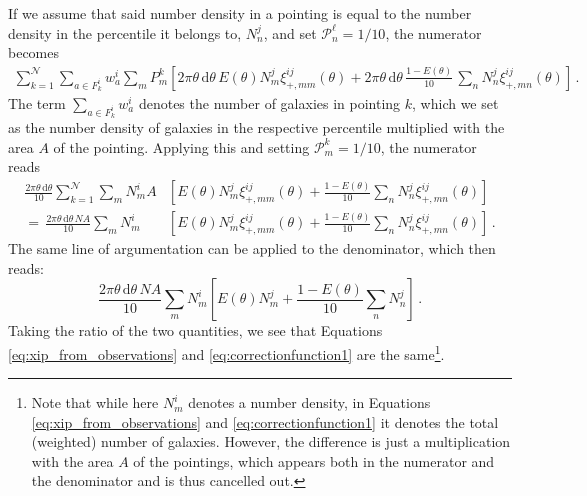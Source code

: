 \documentclass[referee]{aa} %
\renewcommand{\[}{\begin{equation}}
\renewcommand{\]}{\end{equation}}
\renewcommand{\rm}{\mathrm}
\def\d{\rm{d}}
\begin{document}
\begin{appendix}
If we assume that said number density in a pointing is equal to the number density in the percentile it belongs to, $N_n^j$, and set $\mathcal{P}_n^\ell=1/10$, the numerator becomes \begin{align}
\sum_{k=1}^\mathcal{N} \sum_{a\in F_k^i} w_a^i \sum_m P^k_m \left[2\pi\theta\,\d\theta\,E(\theta) N_m^j \xi_{+,mm}^{ij}(\theta) + 2\pi\theta\,\d\theta\,\frac{1-E(\theta)}{10}\, \sum_n N_n^j \xi_{+,mn}^{ij}(\theta) \right] \, .
\end{align}
The term $\sum_{a\in F_k^i} w_a^i$ denotes the number of galaxies in pointing $k$, which we set as the number density of galaxies in the respective percentile multiplied with the area $A$ of the pointing. Applying this and setting $\mathcal{P}_m^k=1/10$, the numerator reads 
\begin{align}
\frac{2\pi\theta\,\d\theta}{10} \sum_{k=1}^\mathcal{N} \sum_m N_m^i A &\left[ E(\theta) N_m^j \xi_{+,mm}^{ij}(\theta) + \frac{1-E(\theta)}{10}\sum_n N_n^j\xi_{+,mn}^{ij}(\theta)\right] \nonumber\\
 =  \, \frac{2\pi\theta\,\d\theta \, NA}{10}  \sum_m N_m^i &\left[ E(\theta) N_m^j \xi_{+,mm}^{ij}(\theta) + \frac{1-E(\theta)}{10}\sum_n N_n^j\xi_{+,mn}^{ij}(\theta)\right] \, .
\end{align}
%
 The same line of argumentation can be applied to the denominator, which then reads: \[
\frac{2\pi\theta\,\d\theta \, NA}{10}  \sum_m N_m^i \left[ E(\theta) N_m^j + \frac{1-E(\theta)}{10}\sum_n N_n^j\right]\, .
 \]
Taking the ratio of the two quantities, we see that Equations \eqref{eq:xip_from_observations} and \eqref{eq:correctionfunction1} are the same\footnote{Note that while here $N_m^i$ denotes a number density, in Equations \eqref{eq:xip_from_observations} and \eqref{eq:correctionfunction1} it denotes the total (weighted) number of galaxies. However, the difference is just a multiplication with the area $A$ of the pointings, which appears both in the numerator and the denominator and is thus cancelled out.}.

\end{appendix}
\end{document}
